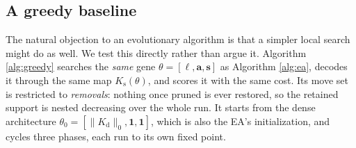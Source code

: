 %   
%
%
%

\subsection{A greedy baseline}
\label{sec:greedy}

The natural objection to an evolutionary algorithm is that a simpler local
search might do as well. We test this directly rather than argue it. Algorithm
\ref{alg:greedy} searches the \emph{same} gene $\theta = [\ell, \mathbf{a},
\mathbf{s}]$ as Algorithm \ref{alg:ea}, decodes it through the same map
$K_\mathrm{s}(\theta)$, and scores it with the same cost. Its move set is
restricted to \emph{removals}: nothing once pruned is ever restored, so the
retained support is nested decreasing over the whole run. It starts from the
dense architecture $\theta_0 = [\|K_\mathrm{d}\|_0, \mathbf{1}, \mathbf{1}]$,
which is also the EA's initialization, and cycles three phases, each run to its
own fixed point.

